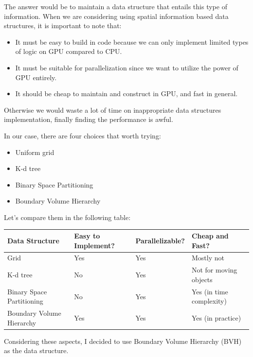 \documentclass[11pt]{article}
\begin{document}
The answer would be to maintain a data structure that entails this type of information. When we are considering using spatial information based data structures, it is important to note that:
\begin{itemize}
\item It must be easy to build in code because we can only implement limited types of logic on GPU compared to CPU.
\item It must be suitable for parallelization since we want to utilize the power of GPU entirely.
\item It should be cheap to maintain and construct in GPU, and fast in general.
\end{itemize}
Otherwise we would waste a lot of time on inappropriate data structures implementation, finally finding the performance is awful.

In our case, there are four choices that worth trying:
\begin{itemize}
\item Uniform grid
\item K-d tree
\item Binary Space Partitioning
\item Boundary Volume Hierarchy
\end{itemize}

Let's compare them in the following table:
\begin{center}
\begin{tabular}{llll}
Data Structure & Easy to Implement? & Parallelizable? & Cheap and Fast?\\
\hline
Grid & Yes & Yes & Mostly not\\
K-d tree & No & Yes & Not for moving objects\\
Binary Space Partitioning & No & Yes & Yes (in time complexity)\\
Boundary Volume Hierarchy & Yes & Yes & Yes (in practice)\\
\end{tabular}

\end{center}

Considering these aspects, I decided to use Boundary Volume Hierarchy (BVH) as the data structure.
\end{document}
